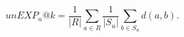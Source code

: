 \begin{equation}
  unEXP_u@k = \frac{1}{|R|}\sum_{a\in R}\frac{1}{|S_u|}\sum_{b\in S_u}d(a,b).
\end{equation}


